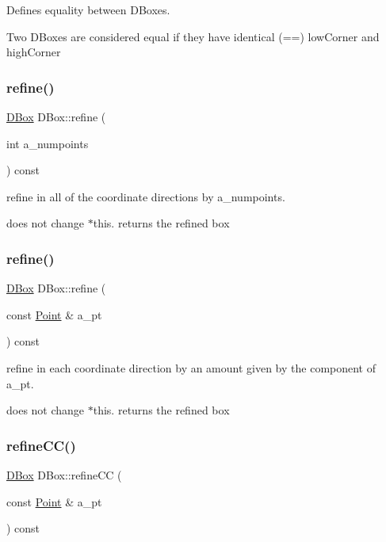 Defines equality between D\+Boxes. 

Two D\+Boxes are considered equal if they have identical (==) low\+Corner and high\+Corner \mbox{\label{class_d_box_aa7a5dc0dac5dc889b86f6014771c4f56}} 
\subsubsection{\texorpdfstring{refine()}{refine()}\hspace{0.1cm}{\footnotesize\ttfamily [1/2]}}
{\footnotesize\ttfamily \hyperlink{class_d_box}{D\+Box} D\+Box\+::refine (\begin{DoxyParamCaption}\item[{int}]{a\+\_\+numpoints }\end{DoxyParamCaption}) const}



refine in all of the coordinate directions by a\+\_\+numpoints. 

does not change $\ast$this. returns the refined box \mbox{\label{class_d_box_a8452a7fb054283c0ed4488decd86cfda}} 
\subsubsection{\texorpdfstring{refine()}{refine()}\hspace{0.1cm}{\footnotesize\ttfamily [2/2]}}
{\footnotesize\ttfamily \hyperlink{class_d_box}{D\+Box} D\+Box\+::refine (\begin{DoxyParamCaption}\item[{const \hyperlink{class_point}{Point} \&}]{a\+\_\+pt }\end{DoxyParamCaption}) const}



refine in each coordinate direction by an amount given by the component of a\+\_\+pt. 

does not change $\ast$this. returns the refined box \mbox{\label{class_d_box_ad36875d6c989bb3d4c8baaad9a5476ff}} 
\subsubsection{\texorpdfstring{refine\+C\+C()}{refineCC()}\hspace{0.1cm}{\footnotesize\ttfamily [1/2]}}
{\footnotesize\ttfamily \hyperlink{class_d_box}{D\+Box} D\+Box\+::refine\+CC (\begin{DoxyParamCaption}\item[{const \hyperlink{class_point}{Point} \&}]{a\+\_\+pt }\end{DoxyParamCaption}) const}



